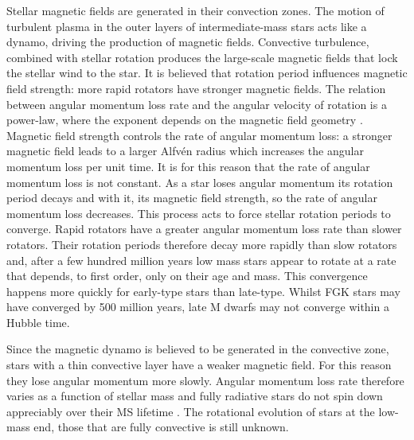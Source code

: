 Stellar magnetic fields are generated in their convection zones.
The motion of turbulent plasma in the outer layers of intermediate-mass stars
acts like a dynamo, driving the production of magnetic fields.
Convective turbulence, combined with stellar rotation produces the large-scale
magnetic fields that lock the stellar wind to the star.
It is believed that rotation period influences magnetic field strength: more
rapid rotators have stronger magnetic fields.
The relation between angular momentum loss rate and the angular velocity of
rotation is a power-law, where the exponent depends on the magnetic field
geometry \citet{Mestel1984, Kawaler1988}.
Magnetic field strength controls the rate of angular momentum loss: a stronger
magnetic field leads to a larger Alfv{\'e}n radius which increases the angular
momentum loss per unit time.
It is for this reason that the rate of angular momentum loss is not constant.
As a star loses angular momentum its rotation period decays and with it, its
magnetic field strength, so the rate of angular momentum loss decreases.
This process acts to force stellar rotation periods to converge.
Rapid rotators have a greater angular momentum loss rate than slower rotators.
Their rotation periods therefore decay more rapidly than slow rotators and,
after a few hundred million years low mass stars appear to rotate at a rate
that depends, to first order, only on their age and mass.
This convergence happens more quickly for early-type stars than late-type.
Whilst FGK stars may have converged by 500 million years, \citep{Radick1987,
Irwin2009} late M dwarfs may not converge within a Hubble time.

Since the magnetic dynamo is believed to be generated in the convective zone,
stars with a thin convective layer have a weaker magnetic field.
For this reason they lose angular momentum more slowly.
Angular momentum loss rate therefore varies as a function of stellar mass and
fully radiative stars do not spin down appreciably over their MS lifetime
\citet{Noyes1984_2}.
The rotational evolution of stars at the low-mass end, those that are fully
convective is still unknown.

